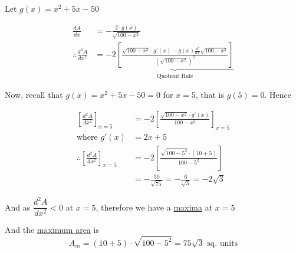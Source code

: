 \documentclass[14pt,fleqn]{extarticle}
\newcommand\ea{100-x^2}
\newcommand\es{\sqrt{\ea}}
\begin{document}
Let $g(x) = x^2 + 5x - 50$\newline 

\begin{align}
\frac{dA}{dx} &= -\frac{2\cdot g(x)}{\es}\\
\therefore \frac{d^2 A	}{dx^2} &= -2 \underbrace{\left[\frac{\es \cdot g'(x) - g(x) \frac{d}{dx}\es}{\left(\es \right)^2} \right]}_{\text{Quotient Rule}}
\end{align}

Now, recall that $g(x) = x^2 + 5x-50 = 0$ for $x = 5$, that is $g(5) = 0$. Hence 

\begin{align}
\left[ \frac{d^2 A}{dx^2}\right]_{x=5} &= -2 \left[\frac{\es\cdot g'(x)}{\ea} \right]_{x=5}\\
\text{where } g'(x) &= 2x + 5 \\ 
\therefore \left[ \frac{d^2 A}{dx^2}\right]_{x=5} &= -2 \left[\frac{\sqrt{100-5^2}\cdot (10 + 5)}{100 - 5^2}\right] \\
&= -\frac{30}{\sqrt{75}} = -\frac{6}{\sqrt{3}} = -2\sqrt{3} 
\end{align}

And as $\dfrac{d^2A}{dx^2} < 0$ at $x=5$, therefore we have a \underline{maxima} at $x=5$ 

And the \underline{maximum area} is  
\[ A_m = (10+5)\cdot \sqrt{100-5^2} = 75\sqrt{3}\text{ sq. units}\]
\end{document}
